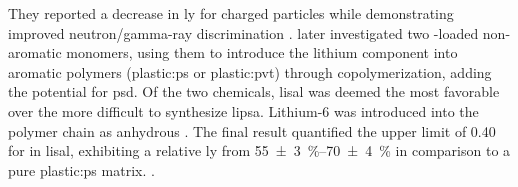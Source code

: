 \documentclass[../../../../main.tex]{subfiles}%
\begin{document}
    They reported a decrease in \gls{ly} for charged particles while demonstrating improved neutron/\gls{gamma-ray} discrimination \cite{Mabe_2014}.
    \citeauthor*{Mabe_2016} later investigated two -loaded non-aromatic monomers, using them to introduce the lithium component into aromatic polymers (\gls{plastic:ps} or \gls{plastic:pvt}) through copolymerization, adding the potential for \gls{psd}.
    Of the two chemicals, \gls{lisal} was deemed the most favorable over the more difficult to synthesize \gls{lipsa}.
    Lithium-6 was introduced into the polymer chain as anhydrous .
    The final result quantified the upper limit of \SI{0.40}{\percentweight} for  in \gls{lisal}, exhibiting a relative \gls{ly} from \SIrange[separate-uncertainty=false]{55(3)}{70(4)}{\percent} in comparison to a pure \gls{plastic:ps} matrix.
    \cite{Mabe_2016}.
\end{document}

